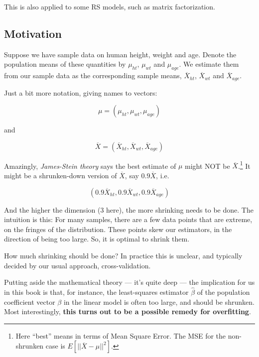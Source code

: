 This is also applied to some RS models, such as matrix factorization.

\subsection{Motivation}

Suppose we have sample data on human height, weight and age.  Denote the
population means of these quantities by $\mu_{ht}$, $\mu_{wt}$ and
$\mu_{age}$.  We estimate them from our sample data as the corresponding
sample means, $\overline{X}_{ht}$, $\overline{X}_{wt}$ and
$\overline{X}_{age}$.

Just a bit more notation, giving names to vectors:

\begin{equation}
\mu = (\mu_{ht},\mu_{wt}, \mu_{age})
\end{equation}

\noindent
and

\begin{equation}
\overline{X} = (\overline{X}_{ht},\overline{X}_{wt}, \overline{X}_{age})
\end{equation}

\noindent
Amazingly, \textit{James-Stein theory} says
the best estimate of $\mu$ might NOT be $\overline{X}$.\footnote{Here
``best'' means in terms of Mean Square Error.  The MSE for the
non-shrunken case is $E \left [||\overline{X} - \mu ||^2 \right ].$}  
It might be a shrunken-down version of $\overline{X}$, say $0.9
\overline{X}$, i.e.

\begin{equation}
(0.9 \overline{X}_{ht},0.9 \overline{X}_{wt}, 0.9 \overline{X}_{age})
\end{equation}

\noindent
And the higher the dimension (3 here), the more shrinking needs to be done.
The intuition is this:  For many samples, there are a few data points
that are extreme, on the fringes of the distribution.  These points skew
our estimators, in the direction of being too large.  So, it is optimal
to shrink them.

How much shrinking should be done?  In practice this is unclear, and
typically decided by our usual approach, cross-validation.

Putting aside the mathematical theory --- it's quite deep --- the
implication for us in this book is that, for instance, the least-squares
estimator $\widehat{\beta}$ of the population coefficient vector $\beta$
in the linear model is often too large, and should be shrunken.  Most
interestingly, \textbf{this turns out to be a possible remedy for
overfitting}.

